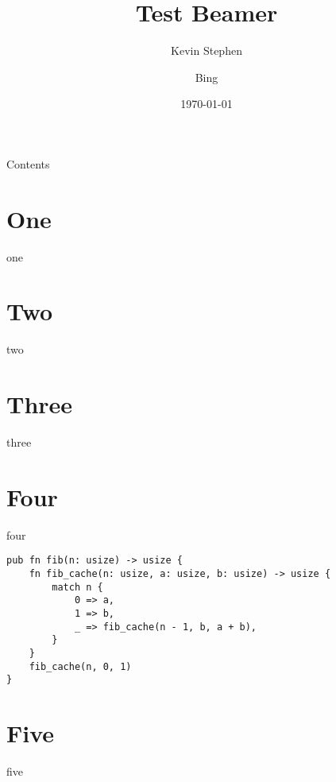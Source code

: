 \documentclass{ksbeamer}
\title{Test Beamer}
\author{Kevin Stephen \and Bing}
\date{\today}
\begin{document}
\frame{\titlepage}

\begin{frame}{Contents}
    \tableofcontents
\end{frame}

\section{One}

\begin{frame}{one}
    \lipsum[1][10]
\end{frame}

\section{Two}

\begin{frame}{two}
    \lipsum[1][10]
\end{frame}

\section{Three}

\begin{frame}{three}
    \lipsum[1][10]
\end{frame}

\section{Four}

\begin{frame}[fragile]{four}
    \begin{center}
        \begin{minipage}{0.8\textwidth}
            \begin{verbatim}
pub fn fib(n: usize) -> usize {
    fn fib_cache(n: usize, a: usize, b: usize) -> usize {
        match n {
            0 => a,
            1 => b,
            _ => fib_cache(n - 1, b, a + b),
        }
    }
    fib_cache(n, 0, 1)
}
            \end{verbatim}
        \end{minipage}
    \end{center}
\end{frame}

\section{Five}

\begin{frame}{five}
    \lipsum[1][10]
\end{frame}
\end{document}
